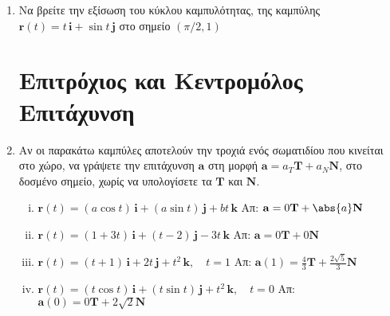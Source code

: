 \begin{enumerate}
    \enlargethispage{2\baselineskip}

  \item Να βρείτε την εξίσωση του κύκλου καμπυλότητας, της καμπύλης $
    \mathbf{r}(t)= t\, \mathbf{i} + \sin{t}\, \mathbf{j} $ στο σημείο $ (\pi /2,1) $

    \section*{Επιτρόχιος και Κεντρομόλος Επιτάχυνση}
    
   \item Αν οι παρακάτω καμπύλες αποτελούν την τροχιά ενός σωματιδίου που κινείται 
     στο χώρο, να γράψετε την επιτάχυνση $ \mathbf{a} $ στη μορφή $ \mathbf{a}= a_{T}
     \mathbf{T} + a_{N} \mathbf{N} $, στο δοσμένο σημείο, χωρίς να υπολογίσετε τα 
     $ \mathbf{T} $ και $ \mathbf{N} $.
     \begin{enumerate}[i)]
       \item $ \mathbf{r}(t)=(a \cos{t})\, \mathbf{i} + (a \sin{t})\, \mathbf{j} + bt \, 
         \mathbf{k} $ 
     \hfill Απ: $ \mathbf{a}= 0 \mathbf{T} + \abs{a} \mathbf{N} $ 

   \item $ \mathbf{r}(t)=(1+3t)\, \mathbf{i} + (t-2)\, \mathbf{j} - 3t\, \mathbf{k} $
     \hfill Απ: $ \mathbf{a}=0 \mathbf{T}+0 \mathbf{N} $  

   \item $ \mathbf{r}(t)=(t+1)\, \mathbf{i} + 2t\, \mathbf{j} + t^{2} \, \mathbf{k},
     \quad t=1 $ 
     \hfill Απ: $ \mathbf{a}(1)= \frac{4}{3} \mathbf{T}+ \frac{2 \sqrt{5}}{3} 
     \mathbf{N} $ 

   \item $ \mathbf{r}(t)=(t \cos{t})\, \mathbf{i} + (t \sin{t})\, \mathbf{j} + t^{2} \,
     \mathbf{k}, \quad t=0 $ 
     \hfill Απ: $ \mathbf{a}(0)=0 \mathbf{T}+2 \sqrt{2} \mathbf{N} $ 
     \end{enumerate}
\end{enumerate}




